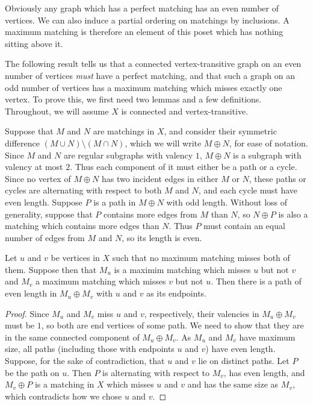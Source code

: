 Obviously any graph which has a perfect matching has an even number of vertices.  We can also induce a partial ordering on matchings by inclusions.  A maximum matching is therefore an element of this poset which has nothing sitting above it.

The following result tells us that a connected vertex-transitive graph on an even number of vertices \textit{must} have a perfect matching, and that such a graph on an odd number of vertices has a maximum matching which misses exactly one vertex.  To prove this, we first need two lemmas and a few definitions.  Throughout, we will assume $X$ is connected and vertex-transitive.


Suppose that $M$ and $N$ are matchings in $X$, and consider their symmetric difference $(M\cup N)\setminus (M\cap N)$, which we will write $M\oplus N$, for ease of notation.  Since $M$ and $N$ are regular subgraphs with valency $1$, $M\oplus N$ is  a  subgraph with valency at most $2$.  Thus each component of it must either be a path or a cycle.  Since no vertex of $M\oplus N$ has two incident edges in either $M$ or $N$, these paths or cycles are alternating with respect to both $M$ and $N$, and each cycle must have even length. Suppose $P$ is a path in $M\oplus N$ with odd length.  Without loss of generality, suppose that $P$ contains more edges from $M$ than $N$, so $N\oplus P$ is also a matching which contains more edges than $N$. Thus $P$ must contain an equal number of edges from $M$ and $N$, so its length is even.


\begin{lemma}
	Let $u$ and $v$ be vertices in $X$ such that no maximum matching misses both of them.  Suppose then that $M_u$ is a maximim matching which misses $u$ but not $v$ and $M_v$ a maximum matching which misses $v$ but not $u$.  Then there is a path of even length in $M_u\oplus M_v$ with $u$ and $v$ as its endpoints.
	
\end{lemma}




\begin{proof}
	Since $M_u$ and $M_v$ miss $u$ and $v$, respectively, their valencies in $M_u\oplus M_v$ must be $1$, so both are end vertices of some path.  We need to show that they are in the same connected component of $M_u\oplus M_v$.  As $M_u$ and $M_v$ have maximum size, all paths (including those with endpoints $u$ and $v$) have even length.  Suppose, for the sake of contradiction, that $u$ and $v$ lie on distinct paths.  Let $P$ be the path on $u$.  Then $P$ is alternating with respect to $M_v$,  has even length, and $M_v\oplus P$ is a matching in $X$ which misses $u$ and $v$ and has the same size as $M_v$, which contradicts how we chose $u$ and $v$.
\end{proof}

